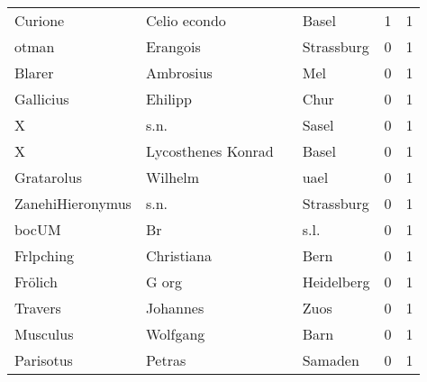 \documentclass[10pt,a4paper,landscape]{article}
\begin{document}
\begin{longtable}{llllrr}
                  Curione &                       Celio econdo &             &                                       Basel &          1 &         1 \\
                    otman &                           Erangois &             &                                  Strassburg &          0 &         1 \\
                   Blarer &                          Ambrosius &             &                                         Mel &          0 &         1 \\
                Gallicius &                            Ehilipp &             &                                        Chur &          0 &         1 \\
                        X &                               s.n. &             &                                       Sasel &          0 &         1 \\
                        X &                 Lycosthenes Konrad &             &                                       Basel &          0 &         1 \\
               Gratarolus &                            Wilhelm &             &                                        uael &          0 &         1 \\
         ZanehiHieronymus &                               s.n. &             &                                  Strassburg &          0 &         1 \\
                    bocUM &                                 Br &             &                                        s.l. &          0 &         1 \\
                Frlpching &                         Christiana &             &                                        Bern &          0 &         1 \\
                  Frölich &                              G org &             &                                  Heidelberg &          0 &         1 \\
                  Travers &                           Johannes &             &                                        Zuos &          0 &         1 \\
                 Musculus &                           Wolfgang &             &                                        Barn &          0 &         1 \\
                Parisotus &                             Petras &             &                                     Samaden &          0 &         1 \\

\end{longtable}
\end{document}
